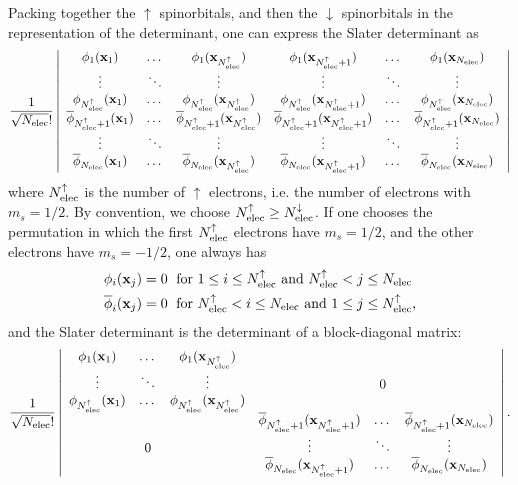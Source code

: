 \documentclass[./thesis.tex]{subfiles}
\begin{document}
Packing together the $\uparrow$ spinorbitals, and then the $\downarrow$ spinorbitals in the representation of
the determinant, one can express the Slater determinant as
\begin{equation}
\frac{1}{\sqrt{{N_\text{elec}}}!} \left|
 \begin{array}{cccccc}
 \phi_1({\bf x}_1)  & \dots & \phi_1({\bf x}_{{N_\text{elec}^{\uparrow}}}) & \phi_1({\bf x}_{{N_\text{elec}^{\uparrow}}+1}) & \dots & \phi_1({\bf x}_{{N_\text{elec}}}) \\
 \vdots             & \ddots& \vdots                    & \vdots                      &\ddots & \vdots  \\         
 \phi_{{N_\text{elec}^{\uparrow}}}({\bf x}_1)  & \dots & \phi_{{N_\text{elec}^{\uparrow}}}({\bf x}_{{N_\text{elec}^{\uparrow}}}) & \phi_{{N_\text{elec}^{\uparrow}}}({\bf x}_{{N_\text{elec}^{\uparrow}}+1}) & \dots & \phi_{{N_\text{elec}^{\uparrow}}}({\bf x}_{{N_\text{elec}}}) \\
 \overline{\phi}_{{N_\text{elec}^{\uparrow}}+1}({\bf x}_1)  & \dots & \overline{\phi}_{{N_\text{elec}^{\uparrow}}+1}({\bf x}_{{N_\text{elec}^{\uparrow}}}) & \overline{\phi}_{{N_\text{elec}^{\uparrow}}+1}({\bf x}_{{N_\text{elec}^{\uparrow}}+1}) & \dots & \overline{\phi}_{{N_\text{elec}^{\uparrow}}+1}({\bf x}_{{N_\text{elec}}}) \\
 \vdots             & \ddots& \vdots                    & \vdots                      &\ddots & \vdots  \\         
 \overline{\phi}_{{N_\text{elec}}}({\bf x}_1)  & \dots & \overline{\phi}_{{N_\text{elec}}}({\bf x}_{{N_\text{elec}^{\uparrow}}}) & \overline{\phi}_{{N_\text{elec}}}({\bf x}_{{N_\text{elec}^{\uparrow}}+1}) & \dots & \overline{\phi}_{{N_\text{elec}}}({\bf x}_{{N_\text{elec}}}) \\
 \end{array}
\right| 
\end{equation}
where ${N_\text{elec}^{\uparrow}}$ is the number of $\uparrow$ electrons, i.e. the number of electrons with $m_s=1/2$. By convention, we choose ${N_\text{elec}^{\uparrow}} \ge {N_\text{elec}^{\downarrow}}$.
If one chooses the permutation in which the first ${N_\text{elec}^{\uparrow}}$ electrons have $m_s=1/2$, and the other electrons have $m_s=-1/2$, one always has
\begin{align}
\phi_i(\mathbf{x}_j) & = 0 \; \text{ for } 1 \le i \le {N_\text{elec}^{\uparrow}} \text{ and } {N_\text{elec}^{\uparrow}} < j \le {N_\text{elec}} \\ \nonumber
\overline{\phi}_i(\mathbf{x}_j) & = 0 \; \text{ for }  {N_\text{elec}^{\uparrow}} < i \le {N_\text{elec}} \text{ and }  1 \le j \le {N_\text{elec}^{\uparrow}},
\end{align}
and the Slater determinant is the determinant of a block-diagonal matrix:
\begin{equation}
\frac{1}{\sqrt{{N_\text{elec}}}!} \left|
 \begin{array}{cccccc}
 \phi_1({\bf x}_1)  & \dots & \phi_1({\bf x}_{{N_\text{elec}^{\uparrow}}}) &   & &   \\
 \vdots             &\ddots & \vdots                    & &  0    & \\         
 \phi_{{N_\text{elec}^{\uparrow}}}({\bf x}_1)  & \dots & \phi_{{N_\text{elec}^{\uparrow}}}({\bf x}_{{N_\text{elec}^{\uparrow}}}) &   & &   \\
   & & & \overline{\phi}_{{N_\text{elec}^{\uparrow}}+1}({\bf x}_{{N_\text{elec}^{\uparrow}}+1}) & \dots & \overline{\phi}_{{N_\text{elec}^{\uparrow}}+1}({\bf x}_{{N_\text{elec}}}) \\
 & 0 & & \vdots                      &\ddots & \vdots  \\         
   & &   & \overline{\phi}_{{N_\text{elec}}}({\bf x}_{{N_\text{elec}^{\uparrow}}+1}) & \dots & \overline{\phi}_{{N_\text{elec}}}({\bf x}_{{N_\text{elec}}}) \\
 \end{array}
\right|. 
\end{equation}
\end{document}
